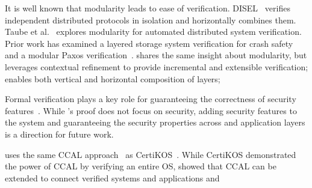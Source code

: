 It is well known that modularity leads to ease of verification. DISEL~\cite{disel} verifies independent distributed protocols in isolation and horizontally combines them. Taube et al.~\cite{modular} explores modularity for automated distributed system verification.
Prior work has examined a layered storage system verification for crash safety~\cite{vijay,fscq, pushbuttonfs} and a modular Paxos verification~\cite{dpaxos,sdpaxos}.
\sysname{} shares the same insight about modularity, but leverages contextual refinement to provide incremental and extensible verification; enables both vertical and horizontal composition of layers; 


Formal verification plays a key role for guaranteeing the correctness of security features~\cite{vale, komodo, ironclad, expressos}. While \sysname{}'s proof does not focus on security, adding security features to the system and guaranteeing the security properties across \sysname{} and application layers is a direction for future work.  

\sysname{} uses the same CCAL approach~\cite{deepspec, concurrency} as CertiKOS~\cite{certikos:osdi16}. While CertiKOS demonstrated the power of CCAL by verifying an entire OS, \sysname{} showed that CCAL can be extended to connect verified systems and applications and 




